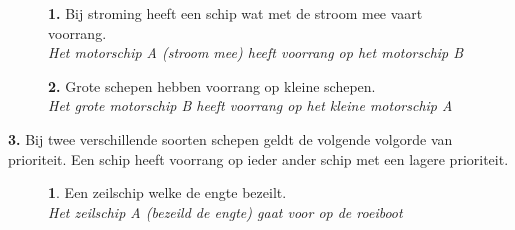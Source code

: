 \begin{figure}[H]
	\centering
	\begin{minipage}[t]{0.70\textwidth}
		\textbf{1.} Bij stroming heeft een schip wat met de stroom mee vaart voorrang.\\
		\textit{Het motorschip A (stroom mee) heeft voorrang op het motorschip B}
	\end{minipage}
	\hfill
	\begin{minipage}[t]{0.25\textwidth}
		\label{pic:engte:1}
	\end{minipage}
	\hfill
\end{figure}
\vspace{-0.7cm}

\begin{figure}[H]
	\centering
	\begin{minipage}[t]{0.70\textwidth}
		\textbf{2.} Grote schepen hebben voorrang op kleine schepen.\\
		\textit{Het grote motorschip B heeft voorrang op het kleine motorschip A}
	\end{minipage}
	\hfill
	\begin{minipage}[t]{0.25\textwidth}
		\label{pic:engte:2}
	\end{minipage}
	\hfill
\end{figure}
\vspace{-0.5cm}

\textbf{3.} Bij twee verschillende soorten schepen geldt de volgende volgorde van prioriteit. Een schip heeft voorrang op ieder ander schip met een lagere prioriteit.
\vspace{-0.5cm}
\begin{figure}[H]
	\centering
	\hspace{0.02\textwidth}
	\begin{minipage}[t]{0.70\textwidth}
		\textbf{1}. Een zeilschip welke de engte bezeilt\footnotemark. \\
		\textit{Het zeilschip A (bezeild de engte) gaat voor op de roeiboot}
	\end{minipage}
	\hfill
	\begin{minipage}[t]{0.25\textwidth}
		\label{pic:engte:3}
	\end{minipage}
	\hfill
\end{figure}
\vspace{-0.7cm}

